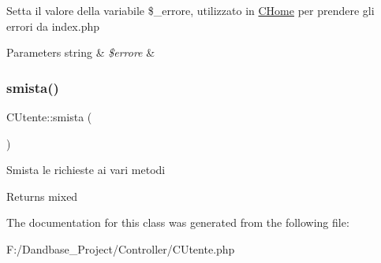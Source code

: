 Setta il valore della variabile \$\+\_\+errore, utilizzato in \mbox{\hyperlink{class_c_home}{C\+Home}} per prendere gli errori da index.\+php


\begin{DoxyParams}[1]{Parameters}
string & {\em \$errore} & \\
\hline
\end{DoxyParams}
\mbox{\label{class_c_utente_a8f3f8bb1dda55eda00a1f13281bcd0f4}} 
\subsubsection{\texorpdfstring{smista()}{smista()}}
{\footnotesize\ttfamily C\+Utente\+::smista (\begin{DoxyParamCaption}{ }\end{DoxyParamCaption})}

Smista le richieste ai vari metodi

\begin{DoxyReturn}{Returns}
mixed 
\end{DoxyReturn}


The documentation for this class was generated from the following file\+:\begin{DoxyCompactItemize}
\item 
F\+:/\+Dandbase\+\_\+\+Project/\+Controller/C\+Utente.\+php\end{DoxyCompactItemize}
